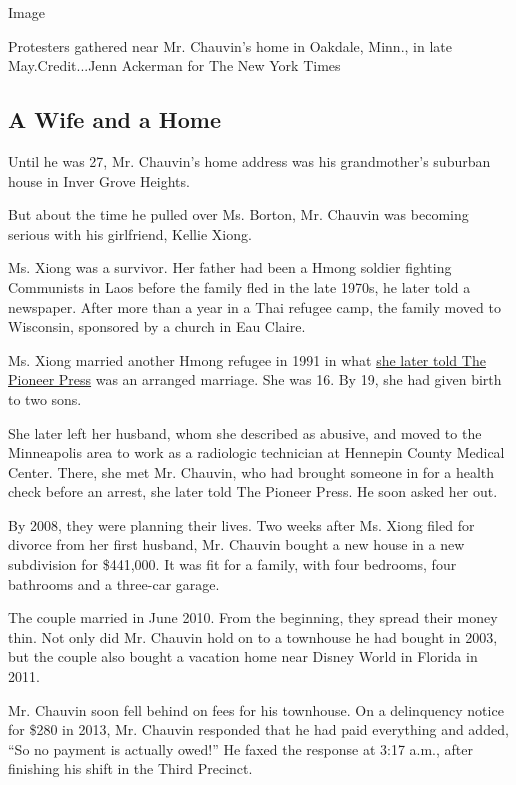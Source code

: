 Image

Protesters gathered near Mr. Chauvin's home in Oakdale, Minn., in late
May.Credit...Jenn Ackerman for The New York Times

\hypertarget{a-wife-and-a-home}{%
\subsection{A Wife and a Home}\label{a-wife-and-a-home}}

Until he was 27, Mr. Chauvin's home address was his grandmother's
suburban house in Inver Grove Heights.

But about the time he pulled over Ms. Borton, Mr. Chauvin was becoming
serious with his girlfriend, Kellie Xiong.

Ms. Xiong was a survivor. Her father had been a Hmong soldier fighting
Communists in Laos before the family fled in the late 1970s, he later
told a newspaper. After more than a year in a Thai refugee camp, the
family moved to Wisconsin, sponsored by a church in Eau Claire.

Ms. Xiong married another Hmong refugee in 1991 in what
\href{https://www.twincities.com/2019/01/06/first-hmong-mrs-minnesota-america-readies-for-the-national-pageant-stage/https://www.twincities.com/2018/06/02/refugee-who-was-shamed-for-her-looks-as-a-child-is-vying-to-be-the-first-hmong-mrs-minnesota/}{she
later told The Pioneer Press} was an arranged marriage. She was 16. By
19, she had given birth to two sons.

She later left her husband, whom she described as abusive, and moved to
the Minneapolis area to work as a radiologic technician at Hennepin
County Medical Center. There, she met Mr. Chauvin, who had brought
someone in for a health check before an arrest, she later told The
Pioneer Press. He soon asked her out.

By 2008, they were planning their lives. Two weeks after Ms. Xiong filed
for divorce from her first husband, Mr. Chauvin bought a new house in a
new subdivision for \$441,000. It was fit for a family, with four
bedrooms, four bathrooms and a three-car garage.

The couple married in June 2010. From the beginning, they spread their
money thin. Not only did Mr. Chauvin hold on to a townhouse he had
bought in 2003, but the couple also bought a vacation home near Disney
World in Florida in 2011.

Mr. Chauvin soon fell behind on fees for his townhouse. On a delinquency
notice for \$280 in 2013, Mr. Chauvin responded that he had paid
everything and added, ``So no payment is actually owed!'' He faxed the
response at 3:17 a.m., after finishing his shift in the Third Precinct.

